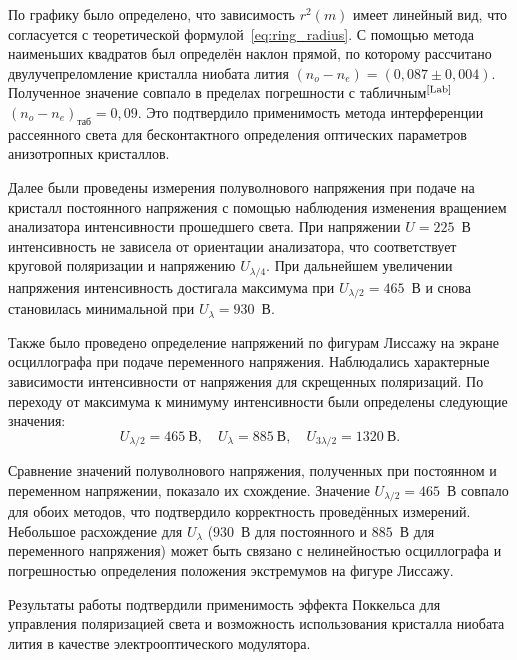 По графику было определено, что зависимость $r^2(m)$ имеет линейный вид, что согласуется с теоретической формулой~\eqref{eq:ring_radius}. С помощью метода наименьших квадратов был определён наклон прямой, по которому рассчитано двулучепреломление кристалла ниобата лития $(n_o - n_e) = (0,087 \pm 0,004)$. Полученное значение совпало в пределах погрешности с табличным$^\text{\cite{Lab}}$ $(n_o - n_e)_\text{таб} = 0,09$. Это подтвердило применимость метода интерференции рассеянного света для бесконтактного определения оптических параметров анизотропных кристаллов.

Далее были проведены измерения полуволнового напряжения при подаче на кристалл постоянного напряжения с помощью наблюдения изменения вращением анализатора интенсивности прошедшего света. При напряжении $U = 225$~В интенсивность не зависела от ориентации анализатора, что соответствует круговой поляризации и напряжению $U_{\lambda/4}$. При дальнейшем увеличении напряжения интенсивность достигала максимума при $U_{\lambda/2} = 465$~В и снова становилась минимальной при $U_{\lambda} = 930$~В.

Также было проведено определение напряжений по фигурам Лиссажу на экране осциллографа при подаче переменного напряжения. Наблюдались характерные зависимости интенсивности от напряжения для скрещенных поляризаций. По переходу от максимума к минимуму интенсивности были определены следующие значения:
\[
    U_{\lambda/2} = 465~\text{В}, \quad U_{\lambda} = 885~\text{В}, \quad U_{3\lambda/2} = 1320~\text{В}.
\]

Сравнение значений полуволнового напряжения, полученных при постоянном и переменном напряжении, показало их схождение. Значение $U_{\lambda/2} = 465$~В совпало для обоих методов, что подтвердило корректность проведённых измерений. Небольшое расхождение для $U_{\lambda}$ ($930$~В для постоянного и $885$~В для переменного напряжения) может быть связано с нелинейностью осциллографа и погрешностью определения положения экстремумов на фигуре Лиссажу.

Результаты работы подтвердили применимость эффекта Поккельса для управления поляризацией света и возможность использования кристалла ниобата лития в качестве электрооптического модулятора.
